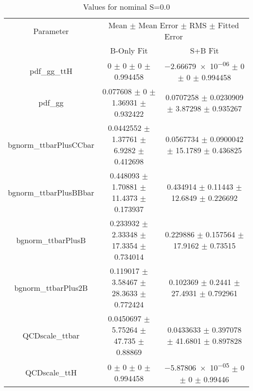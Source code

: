 \begin{table}
\centering
\caption{Values for nominal S=0.0}
\begin{tabular}{ccc}
\toprule
Parameter & \multicolumn{2}{c}{Mean $\pm$ Mean Error $\pm$ RMS $\pm$ Fitted Error}\\
 & B-Only Fit & S+B Fit\\
\midrule
pdf\_gg\_ttH & \num{0} $\pm$ \num{0} $\pm$ \num{0} $\pm$ \num{0.994458} & \num{-2.66679e-06} $\pm$ \num{0} $\pm$ \num{0} $\pm$ \num{0.994458}\\
pdf\_gg & \num{0.077608} $\pm$ \num{0} $\pm$ \num{1.36931} $\pm$ \num{0.932422} & \num{0.0707258} $\pm$ \num{0.0230909} $\pm$ \num{3.87298} $\pm$ \num{0.935267}\\
bgnorm\_ttbarPlusCCbar & \num{0.0442552} $\pm$ \num{1.37761} $\pm$ \num{6.9282} $\pm$ \num{0.412698} & \num{0.0567734} $\pm$ \num{0.0900042} $\pm$ \num{15.1789} $\pm$ \num{0.436825}\\
bgnorm\_ttbarPlusBBbar & \num{0.448093} $\pm$ \num{1.70881} $\pm$ \num{11.4373} $\pm$ \num{0.173937} & \num{0.434914} $\pm$ \num{0.11443} $\pm$ \num{12.6849} $\pm$ \num{0.226692}\\
bgnorm\_ttbarPlusB & \num{0.233932} $\pm$ \num{2.33348} $\pm$ \num{17.3354} $\pm$ \num{0.734014} & \num{0.229886} $\pm$ \num{0.157564} $\pm$ \num{17.9162} $\pm$ \num{0.73515}\\
bgnorm\_ttbarPlus2B & \num{0.119017} $\pm$ \num{3.58467} $\pm$ \num{28.3633} $\pm$ \num{0.772424} & \num{0.102369} $\pm$ \num{0.2441} $\pm$ \num{27.4931} $\pm$ \num{0.792961}\\
QCDscale\_ttbar & \num{0.0450697} $\pm$ \num{5.75264} $\pm$ \num{47.735} $\pm$ \num{0.88869} & \num{0.0433633} $\pm$ \num{0.397078} $\pm$ \num{41.6801} $\pm$ \num{0.897828}\\
QCDscale\_ttH & \num{0} $\pm$ \num{0} $\pm$ \num{0} $\pm$ \num{0.994458} & \num{-5.87806e-05} $\pm$ \num{0} $\pm$ \num{0} $\pm$ \num{0.99446}\\
\bottomrule
\end{tabular}
\end{table}